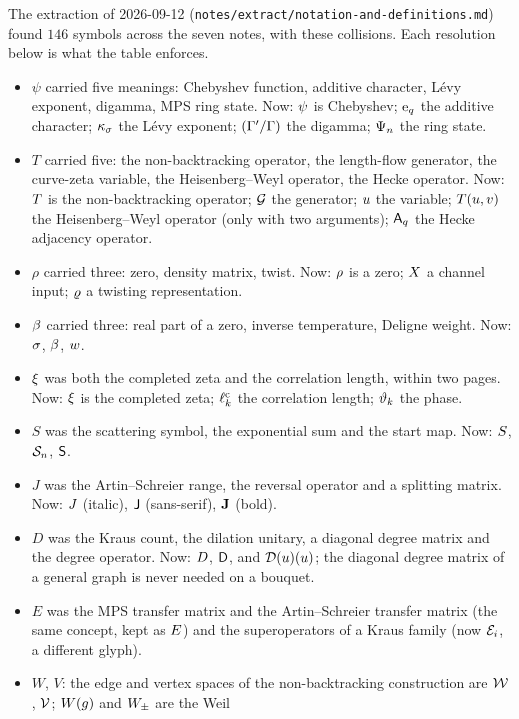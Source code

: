 The extraction of 2026-09-12 (\texttt{notes/extract/notation-and-definitions.md})
found $146$ symbols across the seven notes, with these collisions. Each
resolution below is what the table enforces.
\begin{itemize}
  \item $\psi$ carried five meanings: Chebyshev function, additive character, %
  Lévy exponent, digamma, MPS ring state. Now: $\psi$ is Chebyshev;
  $\mathrm e_q$ the additive character; $\kappa_{\sigma}$ the Lévy exponent;
  $(\Gamma'/\Gamma)$ the digamma; $\Psi_{n}$ the ring state.
  \item $T$ carried five: the non-backtracking operator, the length-flow
  generator, the curve-zeta variable, the Heisenberg--Weyl operator, the
  Hecke operator. Now: $T$ is the non-backtracking operator; $\mathcal G$
  the generator; $u$ the variable; $T(u,v)$ the Heisenberg--Weyl operator
  (only with two arguments); $\mathsf A_{q}$ the Hecke adjacency operator.
  \item $\rho$ carried three: zero, density matrix, twist. Now: $\rho$ is a %
  zero; $X$ a channel input; $\varrho$ a twisting representation.
  \item $\beta$ carried three: real part of a zero, inverse temperature,
  Deligne weight. Now: $\sigma$, $\beta$, $w$.
  \item $\xi$ was both the completed zeta and the correlation length, within
  two pages. Now: $\xi$ is the completed zeta; $\ell^{\mathrm{c}}_{k}$ the correlation
  length; $\vartheta_{k}$ the phase.
  \item $S$ was the scattering symbol, the exponential sum and the start map.
  Now: $S$, $\mathcal S_{n}$, $\mathsf S$.
  \item $J$ was the Artin--Schreier range, the reversal operator and a
  splitting matrix. Now: $J$ (italic), $\mathsf J$ (sans-serif),
  $\mathbf J$ (bold).
  \item $D$ was the Kraus count, the dilation unitary, a diagonal degree
  matrix and the degree operator. Now: $D$, $\mathsf D$, and $\mathcal D(u)(u)$; the
  diagonal degree matrix of a general graph is never needed on a bouquet.
  \item $E$ was the MPS transfer matrix and the Artin--Schreier transfer
  matrix (the same concept, kept as $E$) and the superoperators of a
  Kraus family (now $\mathcal E_{i}$, a different glyph).
  \item $W$, $V$: the edge and vertex spaces of the non-backtracking
  construction are $\mathcal W$, $\mathcal V$; $W(g)$ and $W_{\pm}$ are the Weil

\end{itemize}
